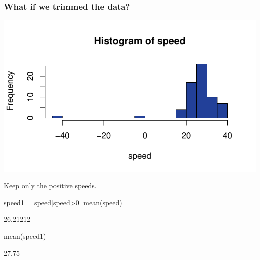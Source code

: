 \documentclass[a4paper]{article}
\begin{document}
\subsubsection{What if we trimmed the data?}
\begin{Schunk}


{\centering \includegraphics[width=\maxwidth]{figure/listings-unnamed-chunk-170-1} 

}

\end{Schunk}
Keep only the positive speeds.
\begin{Schunk}
\begin{Sinput}
speed1 = speed[speed>0]
mean(speed)
\end{Sinput}
\begin{Soutput}
[1] 26.21212
\end{Soutput}
\begin{Sinput}
mean(speed1)
\end{Sinput}
\begin{Soutput}
[1] 27.75
\end{Soutput}
\end{Schunk}
\end{document}
